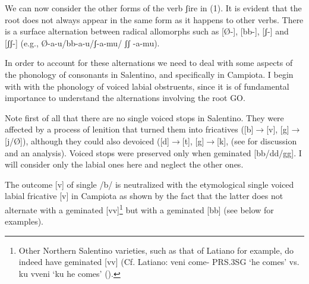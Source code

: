 \documentclass[output=paper]{langscibook}
\begin{document}
We can now consider the other forms of the verb ʃire  in  (1).  It is evident that the root does not always appear in the same form as it happens to other verbs.  There is a surface alternation between radical allomorphs such as  [Ø-], [bb-], [ʃ-]  and  [ʃʃ-]  (e.g.,  Ø-a-u/bb-a-u/ʃ-a-mu/ ʃʃ -a-mu).  

In order to account for these alternations we need to deal with some aspects of the phonology of consonants in Salentino, and specifically in Campiota.   I begin with with the phonology of voiced labial obstruents, since it is of fundamental importance to understand the alternations involving the root GO.  

Note first of all that there are no single voiced stops in Salentino.  They were affected by a process of lenition that turned them into fricatives ([b]$\rightarrow$[v], [g]$\rightarrow$ [j/Ø]), although they could also devoiced ([d]$\rightarrow$[t], [g]$\rightarrow$[k], (see \cite{calabrese1987a} for discussion and an analysis).  Voiced stops were preserved only when geminated [bb/dd/gg]. I will consider only the labial ones here and neglect the other ones.

The outcome [v] of single /b/ is neutralized with the etymological single voiced labial fricative [v] in Campiota as shown by the fact that  the latter does not alternate with a geminated [vv]\footnote{Other Northern Salentino varieties, such as that of Latiano for example, do indeed have geminated [vv] (Cf. Latiano: veni come- PRS.3SG ‘he comes’ vs. ku vveni ‘ku he comes’ (\cite{urgese2003a}).}  but with a geminated [bb] (see below for examples).
\end{document}
